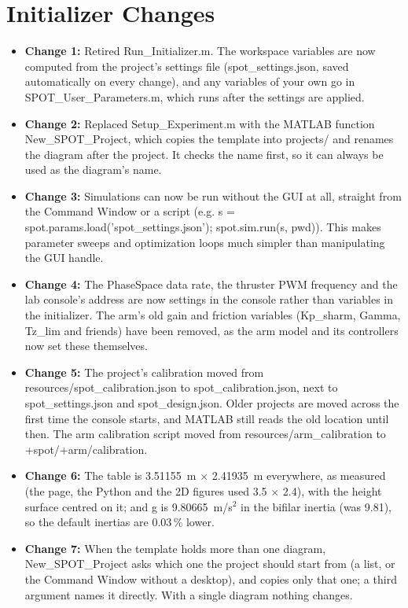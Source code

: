 \documentclass[11pt]{article}
\begin{document}
\section*{\textcolor{primaryColor}{Initializer Changes}}
\begin{itemize}[label={\textcolor{primaryColor}{\textbullet}}]
    \item \textbf{Change 1:} Retired Run\_Initializer.m. The workspace variables are now computed from the project's settings file (spot\_settings.json, saved automatically on every change), and any variables of your own go in SPOT\_User\_Parameters.m, which runs after the settings are applied.
    \item \textbf{Change 2:} Replaced Setup\_Experiment.m with the MATLAB function New\_SPOT\_\allowbreak Project, which copies the template into projects/ and renames the diagram after the project. It checks the name first, so it can always be used as the diagram's name.
    \item \textbf{Change 3:} Simulations can now be run without the GUI at all, straight from the Command Window or a script (e.g. s = spot.params.load('spot\_settings.json'); spot.sim.run(s, pwd)). This makes parameter sweeps and optimization loops much simpler than manipulating the GUI handle.
    \item \textbf{Change 4:} The PhaseSpace data rate, the thruster PWM frequency and the lab console's address are now settings in the console rather than variables in the initializer. The arm's old gain and friction variables (Kp\_sharm, Gamma, Tz\_lim and friends) have been removed, as the arm model and its controllers now set these themselves.
    \item \textbf{Change 5:} The project's calibration moved from resources/spot\_calibration.json to spot\_calibration.json, next to spot\_settings.json and spot\_design.json. Older projects are moved across the first time the console starts, and MATLAB still reads the old location until then. The arm calibration script moved from resources/arm\_calibration to +spot/+arm/calibration.
    \item \textbf{Change 6:} The table is 3.51155~m $\times$ 2.41935~m everywhere, as measured (the page, the Python and the 2D figures used 3.5 $\times$ 2.4), with the height surface centred on it; and g is 9.80665~m/s$^2$ in the bifilar inertia (was 9.81), so the default inertias are 0.03\,\% lower.
    \item \textbf{Change 7:} When the template holds more than one diagram, New\_SPOT\_\allowbreak Project asks which one the project should start from (a list, or the Command Window without a desktop), and copies only that one; a third argument names it directly. With a single diagram nothing changes.

\end{itemize}
\end{document}
